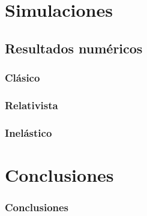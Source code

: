 \documentclass{beamer}
\begin{document}

\section{Simulaciones}
\subsection{Resultados numéricos}

\begin{frame}
    \frametitle[prueb1]{Clásico}
\end{frame}

\begin{frame}
    \frametitle[prueb1]{Relativista}
\end{frame}

\begin{frame}
    \frametitle[prueb1]{Inelástico}
\end{frame}

\section{Conclusiones}

\begin{frame}
    \frametitle[prueb1]{Conclusiones}
\end{frame}
\end{document}
